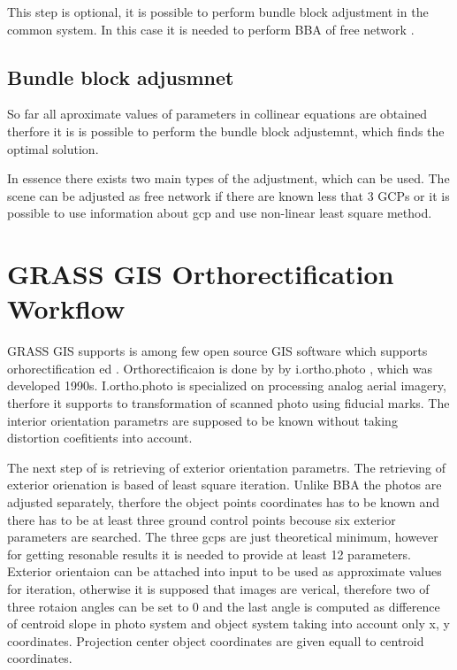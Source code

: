 \documentclass[a4paper,12pt]{report}
\begin{document}
This step is optional, it is possible to perform bundle block adjustment in the common system. In this 
case it is needed to perform BBA of free network \label{sec:free_net_least}. 
 
 
\subsection{Bundle block adjusmnet}

So far all aproximate values of parameters in collinear equations are obtained therfore it 
is is possible to perform the bundle block adjustemnt, which finds the optimal solution.

In essence there exists two main types of the adjustment, which can be used. The scene 
can be adjusted as free network if there are known less that 3 GCPs or it is possible 
to use information about gcp and use non-linear least square method.

\section{GRASS GIS Orthorectification Workflow}

GRASS GIS supports is among few open source GIS software which supports orhorectification ed
\cite{rocchini2012robust}. Orthorectificaion is done by 
by i.ortho.photo \cite{i.ortho.photo}, which was developed 1990s.
I.ortho.photo is specialized on processing analog aerial imagery, therfore 
it supports to transformation of scanned photo using fiducial marks. 
The interior orientation parametrs are supposed to be known without taking distortion 
coefitients into account. 

The next step of is retrieving of exterior orientation parametrs. The retrieving 
of exterior orienation is based of least square iteration. Unlike BBA
the photos are adjusted separately, therfore the object points coordinates has to be known
and there has to be at least three ground control points becouse six exterior parameters are 
searched. The three gcps are just theoretical minimum, however for getting resonable 
results it is needed to provide at least 12 parameters. Exterior orientaion 
can be attached into input to be used as approximate values for iteration,
otherwise it is supposed that images are verical, therefore two of three rotaion
angles can be set to 0 and the last angle is computed as difference of centroid slope
in photo system and object system taking into account only x, y coordinates.
Projection center object coordinates are given equall to centroid coordinates.
\end{document}
